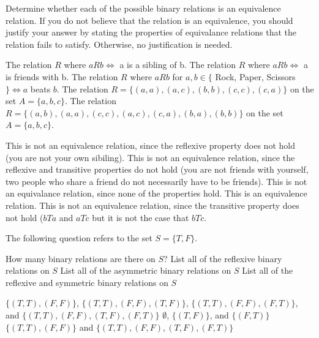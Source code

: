\documentclass[solution, letterpaper]{cs20}
\begin{document}


Determine whether each of the possible binary relations is an equivalence relation. If you do not believe that the relation is an equivalence, you should justify your answer by stating the properties of equivalance relations that the relation fails to satisfy. Otherwise, no justification is needed.

\subproblem The relation $R$ where $aRb \iff$ a is a sibling of b.
\subproblem The relation $R$ where $aRb \iff$ a is friends with b.
\subproblem The relation $R$ where $aRb$ for $a, b \in \{$ Rock, Paper, Scissors $\} \iff a$ beats $b$.
\subproblem The relation $R = \{(a, a), (a, c), (b, b), (c, c), (c, a) \}$ on the set $A = \{a, b, c\}$.
\subproblem The relation $R = \{(a, b), (a, a), (c, c), (a, c), (c, a), (b, a), (b, b) \}$ on the set $A = \{a, b, c\}$.

\solution

\subsolution This is not an equivalence relation, since the reflexive property does not hold (you are not your own sibiling).
\subsolution This is not an equivalence relation, since the reflexive and transitive properties do not hold (you are not friends with yourself, two people who share a friend do not necessarily have to be friends).
\subsolution This is not an equivalance relation, since none of the properties hold.
\subsolution This is an equivalence relation.
\subsolution This is not an equivalence relation, since the transitive property does not hold ($bTa$ and $aTc$ but it is not the case that $bTc$.


The following question refers to the set $S = \{T, F\}$.

\subproblem How many binary relations are there on $S$?
\subproblem List all of the reflexive binary relations on $S$
\subproblem List all of the asymmetric binary relations on $S$
\subproblem List all of the reflexive and symmetric binary relations on $S$

\solution

\subsolution $\{(T, T), (F, F)\}$, $\{(T, T), (F, F), (T, F)\}$, $\{(T, T), (F, F), (F, T)\}$, and $\{(T, T), (F, F), (T, F), (F, T)\}$
\subsolution $\emptyset$, $\{(T, F)\}$, and $\{(F, T)\}$
\subsolution $\{(T, T), (F, F)\}$ and $\{(T, T), (F, F), (T, F), (F, T)\}$
\end{document}
